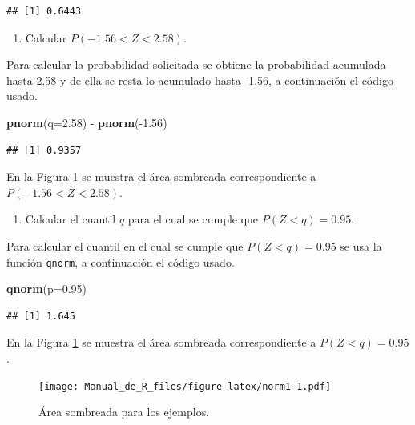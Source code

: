 \documentclass[10pt,]{krantz}
\makeatletter
\newenvironment{Shaded}{\begin{snugshade}}{\end{snugshade}}
\newcommand{\KeywordTok}[1]{\textcolor[rgb]{0.13,0.29,0.53}{\textbf{{#1}}}}
\newcommand{\DataTypeTok}[1]{\textcolor[rgb]{0.13,0.29,0.53}{{#1}}}
\newcommand{\FloatTok}[1]{\textcolor[rgb]{0.00,0.00,0.81}{{#1}}}
\newcommand{\StringTok}[1]{\textcolor[rgb]{0.31,0.60,0.02}{{#1}}}
\newcommand{\NormalTok}[1]{{#1}}
\providecommand{\tightlist}{%
  \setlength{\itemsep}{0pt}\setlength{\parskip}{0pt}}
\newenvironment{kframe}{%
\medskip{}
\setlength{\fboxsep}{.8em}
 \def\at@end@of@kframe{}%
 \ifinner\ifhmode%
  \def\at@end@of@kframe{\end{minipage}}%
  \begin{minipage}{\columnwidth}%
 \fi\fi%
 \def\FrameCommand##1{\hskip\@totalleftmargin \hskip-\fboxsep
 \colorbox{shadecolor}{##1}\hskip-\fboxsep
     \hskip-\linewidth \hskip-\@totalleftmargin \hskip\columnwidth}%
 \MakeFramed {\advance\hsize-\width
   \@totalleftmargin\z@ \linewidth\hsize
   \@setminipage}}%
 {\par\unskip\endMakeFramed%
 \at@end@of@kframe}
\renewenvironment{Shaded}{\begin{kframe}}{\end{kframe}}
\makeatother
\begin{document}
\begin{verbatim}
## [1] 0.6443
\end{verbatim}

\begin{enumerate}
\def\labelenumi{\arabic{enumi})}
\setcounter{enumi}{2}
\tightlist
\item
  Calcular \(P(-1.56 < Z < 2.58)\).
\end{enumerate}

Para calcular la probabilidad solicitada se obtiene la probabilidad
acumulada hasta 2.58 y de ella se resta lo acumulado hasta -1.56, a
continuación el código usado.

\begin{Shaded}
\begin{Highlighting}[]
\KeywordTok{pnorm}\NormalTok{(}\DataTypeTok{q=}\FloatTok{2.58}\NormalTok{) -}\StringTok{ }\KeywordTok{pnorm}\NormalTok{(-}\FloatTok{1.56}\NormalTok{)}
\end{Highlighting}
\end{Shaded}

\begin{verbatim}
## [1] 0.9357
\end{verbatim}

En la Figura \ref{fig:norm1} se muestra el área sombreada
correspondiente a \(P(-1.56 < Z < 2.58)\).

\begin{enumerate}
\def\labelenumi{\arabic{enumi})}
\setcounter{enumi}{3}
\tightlist
\item
  Calcular el cuantil \(q\) para el cual se cumple que \(P(Z<q)=0.95\).
\end{enumerate}

Para calcular el cuantil en el cual se cumple que \(P(Z<q)=0.95\) se usa
la función \texttt{qnorm}, a continuación el código usado.

\begin{Shaded}
\begin{Highlighting}[]
\KeywordTok{qnorm}\NormalTok{(}\DataTypeTok{p=}\FloatTok{0.95}\NormalTok{) }
\end{Highlighting}
\end{Shaded}

\begin{verbatim}
## [1] 1.645
\end{verbatim}

En la Figura \ref{fig:norm1} se muestra el área sombreada
correspondiente a \(P(Z<q)=0.95\).

\begin{figure}[htbp]
\centering
\texttt{[image: Manual\_de\_R\_files/figure-latex/norm1-1.pdf]}
\caption{\label{fig:norm1}Área sombreada para los ejemplos.}
\end{figure}
\end{document}
